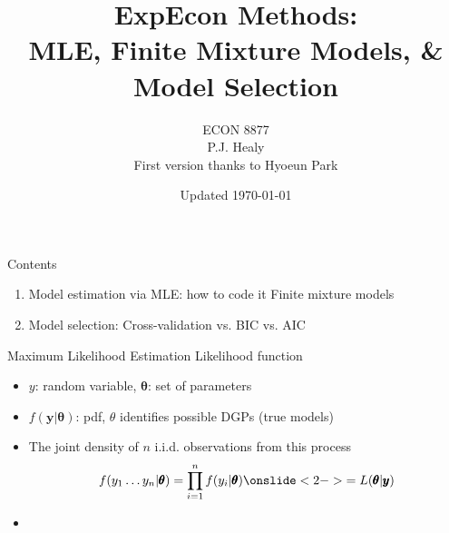 

\title[MLE]{ExpEcon Methods:\\
MLE, Finite Mixture Models, \& Model Selection}
\author[ECON 8877]{ECON 8877\\P.J. Healy\\First version thanks to Hyoeun Park} \color{metrop}
\institute[OSU]{}
\date[]{\vfill {\tiny Updated \today}}



\frame{\maketitle}

\begin{frame}{Contents}
\begin{enumerate}
\item Model estimation via MLE: how to code it Finite mixture models
\item Model selection: Cross-validation vs. BIC vs. AIC
\end{enumerate}
\end{frame}

\begin{frame}{Maximum Likelihood Estimation}
Likelihood function\\
\begin{itemize}
    \item $y$: random variable, $\pmb{\theta}$: set of parameters
    \item $f(\pmb{y}|\pmb{\theta})$: pdf, $\theta$ identifies possible DGPs (true models)
    \item The joint density of $n$ i.i.d. observations from this process
    \begin{equation*}
    f(y_1 \dots y_n|\pmb{\theta})=\prod_{i=1}^n f(y_i|\pmb{\theta})\onslide<2->{=L(\pmb{\theta}|\pmb{y})}
    \end{equation*}
    \item {}
\end{itemize}
\end{frame}

